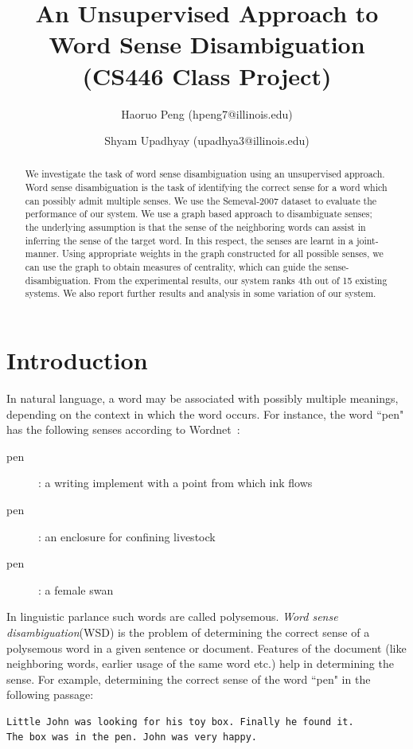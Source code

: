 \documentclass[12pt,letterpaper]{article}
\begin{document}
\title{An Unsupervised Approach to Word Sense Disambiguation \\ \Large{(CS446 Class Project)}}
\author{Haoruo Peng (hpeng7@illinois.edu) \and Shyam Upadhyay (upadhya3@illinois.edu)}
\maketitle
\begin{abstract}
We investigate the task of word sense disambiguation using an unsupervised approach. Word sense disambiguation is the task of identifying the correct sense for a word which can possibly admit multiple senses. We use the Semeval-2007 dataset to evaluate the performance of our system. We use a graph based approach to disambiguate senses; the underlying assumption is that the sense of the neighboring words can assist in inferring the sense of the target word. In this respect, the senses are learnt in a joint-manner. Using appropriate weights in the graph constructed for all possible senses, we can use the graph to obtain measures of centrality, which can guide the sense-disambiguation. From the experimental results, our system ranks 4th out of 15 existing systems. We also report further results and analysis in some variation of our system.
\end{abstract}


\section{Introduction} 
\label{sec:introduction}
In natural language, a word may be associated with possibly multiple meanings, depending on the context in which the word occurs. For instance, the word ``pen" has the following senses according to Wordnet~\cite{wordnet}:
\begin{description}
\item [pen] : a writing implement with a point from which ink flows
\item [pen] : an enclosure for confining livestock
\item [pen] : a female swan
\end{description}

In linguistic parlance such words are called polysemous. \emph{Word sense disambiguation}(WSD) is the problem of determining the correct sense of a polysemous word in a given sentence or document. Features of the document (like neighboring words, earlier usage of the same word etc.) help in determining the sense. For example, determining the correct sense of the word ``pen" in the following passage:
\begin{verbatim}
Little John was looking for his toy box. Finally he found it. 
The box was in the pen. John was very happy.
\end{verbatim}
\end{document}
